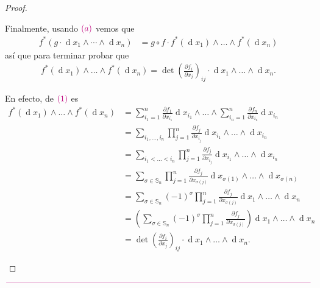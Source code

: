 \documentclass[11pt]{article}
\newcommand{\Ss}{\mathbb{S}}
\renewcommand{\d}{\operatorname{d}}
\newcommand{\paint}[1]{\color{color}{#1}}
\begin{document}
\begin{proof}
\begin{itemize}[listparindent = \parindent]
Finalmente, usando $\paint{(a)}$ vemos que
\begin{align*}
f^*(g\cdot\d x_1\wedge\cdots\wedge\d x_n) &= g \circ f \cdot f^*(\d x_1)\wedge\dots\wedge f^*(\d x_n)
\end{align*}
así que para terminar probar que
\begin{align*}
f^*(\d x_1)\wedge\dots\wedge f^*(\d x_n) = \det\left(\frac{\partial f_i}{\partial x_j}\right)_{ij} \cdot  \d x_1 \wedge\dots\wedge\d x_n.
\end{align*}

En efecto, de $\paint{(1)}$ es
\begin{align*}
f^*(\d x_1)\wedge\dots\wedge f^*(\d x_n) &= \sum_{i_1=1}^n\frac{\partial f_1}{\partial x_{i_1}}\d {x_{i_1}} \wedge \dots \wedge \sum_{i_n=1}^n\frac{\partial f_n}{\partial x_{i_n}}\d {x_{i_n}}\\
&= \sum_{i_1, \dots, i_n}\prod_{j=1}^n\frac{\partial f_j}{\partial x_{i_j}} \d x_{i_1} \wedge\dots\wedge \d x_{i_n}\\
&= \sum_{i_1 < \dots < i_n} \prod_{j=1}^n\frac{\partial f_j}{\partial x_{i_j}} \d x_{i_1} \wedge\dots\wedge \d x_{i_n}\\
&= \sum_{\sigma \in \Ss_n} \prod_{j=1}^n\frac{\partial f_j}{\partial x_{\sigma(j)}} \d x_{\sigma(1)} \wedge\dots\wedge \d x_{\sigma(n)}\\
&= \sum_{\sigma \in \Ss_n} (-1)^\sigma \prod_{j=1}^n\frac{\partial f_j}{\partial x_{\sigma(j)}} \d x_1 \wedge\dots\wedge \d x_n\\
&= \left(\sum_{\sigma \in \Ss_n} (-1)^\sigma \prod_{j=1}^n\frac{\partial f_j}{\partial x_{\sigma(j)}}\right) \d x_1 \wedge\dots\wedge \d x_n\\
&= \det\left(\frac{\partial f_i}{\partial x_j}\right)_{ij} \cdot  \d x_1 \wedge\dots\wedge\d x_n.
\end{align*}
\end{itemize}
\end{proof}

\begin{center}
$\paint{
\rule{400pt}{0.5pt}
}$
\vspace{10pt}
\end{center}
\end{document}

